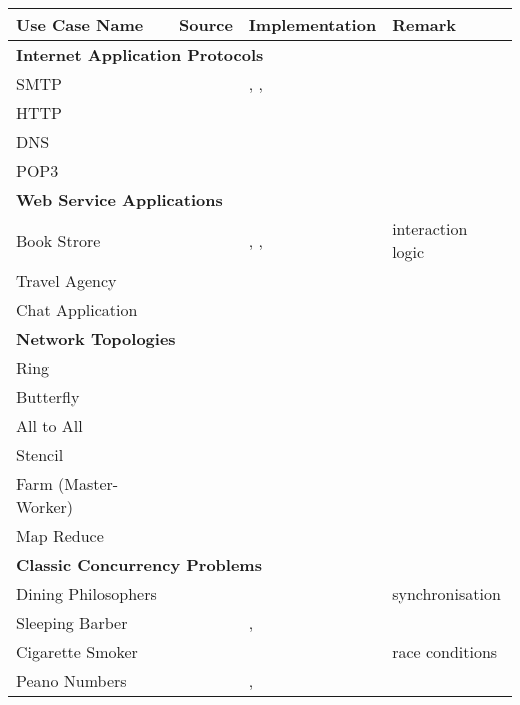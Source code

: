 

\begin{table}
\begin{center}
\begin{tabular}{|l|l|l|l|}
	\hline
	Use Case Name & Source & Implementation & Remark
	\\

	\hline
	\hline
	\multicolumn{4}{|l|}{ \textbf{Internet Application Protocols}}
	\\
	\hline
	SMTP & \cite{SMTP} & \JavaAPI, \TypeState, \Links & 
	\\
	HTTP & \cite{HTTP} & \JavaAPI & 
	\\
	DNS & \cite{DNS} & \Erlang &
	\\
	POP3 & \cite{POP3} & \TypeState & 
	\\

	\hline
	\hline
	\multicolumn{4}{|l|}{ \textbf{Web Service Applications}}
	\\
	\hline
	Book Strore & \cite{BookStore} & \SJ, \Mungo, \JavaAPI  & interaction logic
	\\
	Travel Agency & \cite{TravelAgency} & \SJ &
	\\
	Chat Application & \cite{ChatApplication} & \Erlang &
	\\
	\hline
	\hline
	\multicolumn{4}{|l|}{ \textbf{Network Topologies}}
	\\
	\hline
	Ring & \cite{BerkleyPar} & \MPI &
	\\
	Butterfly & \cite{BerkleyPar} & \MPI &
	\\
	All to All & \cite{BerkleyPar} & \MPI &
	\\
	Stencil & \cite{BerkleyPar} & \MPI &
	\\
	Farm (Master-Worker) & \cite{BerkleyPar} & \MPI &
	\\
	Map Reduce & \cite{BerkleyPar} & \MPI &
	\\
	\hline
	\hline
	\multicolumn{4}{|l|}{ \textbf{Classic Concurrency Problems}}
	\\
	\hline
	Dining Philosophers & \cite{Savina} & \SPython  & synchronisation
	\\
	Sleeping Barber & \cite{Savina} & \SPython, \SScala &
	\\
	Cigarette Smoker & \cite{Savina} & \SPython & race conditions
	\\
	Peano Numbers & \cite{} & \GV, \Links &
	\\
	\hline
	\hline


\end{tabular}
\end{center}
\end{table}
